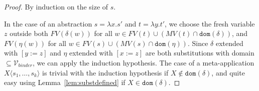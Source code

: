 \documentclass{lmcs}
\theoremstyle{theorem}\newtheorem{theorem}{Theorem}
\theoremstyle{theorem}\newtheorem{lemma}[theorem]{Lemma}
\theoremstyle{theorem}\newtheorem{corollary}[theorem]{Corollary}
\theoremstyle{definition}\newtheorem{definition}[theorem]{Definition}
\theoremstyle{definition}\newtheorem{example}[theorem]{Example}
\newcommand{\V}{\mathcal{V}}
\newcommand{\Vfree}{\mathcal{V}_{\mathit{nonb}}}
\newcommand{\Vbound}{\mathcal{V}_{\mathit{binder}}}
\newcommand{\FV}{\mathit{FV}}
\newcommand{\FMV}{\mathit{MV}}
\newcommand{\domain}{\mathtt{dom}}
\newcommand{\identifier}[1]{\mathtt{#1}}
\newcommand{\afun}{\identifier{f}}
\newcommand{\avar}{x}
\newcommand{\bvar}{y}
\newcommand{\cvar}{z}
\newcommand{\Avar}{X}
\newcommand{\abs}[2]{\lambda #1.#2}
\newcommand{\meta}[2]{#1\langle#2\rangle}
\newcommand{\tuple}[2]{\llparenthesis #1,\dots,#2 \rrparenthesis}
\begin{document}
\begin{proof}
By induction on the size of $s$.

In the case of an abstraction $s = \abs{\avar}{s'}$ and $t = \abs{\bvar}{t'}$,
we choose the fresh variable $\cvar$ outside both $\FV(\delta(w))$ for all $w
\in \FV(t) \cup (\FMV(t) \cap \domain(\delta))$, and $\FV(\eta(w))$ for all
$w \in \FV(s) \cup (\FMV(s) \cap \domain(\eta))$.
Since $\delta$ extended with $[\bvar:=\cvar]$ and $\eta$ extended with
$[\avar:=\cvar]$ are both substitutions with domain $\subseteq \Vbound$,
we can apply the induction hypothesis.  The case of a meta-application
$\meta{\Avar}{s_1,\dots,s_k}$ is trivial with the induction hypothesis if
$\Avar \notin \domain(\delta)$, and quite easy using
Lemma~\ref{lem:substdefined} if $\Avar \in \domain(\delta)$.

\end{proof}
\end{document}
